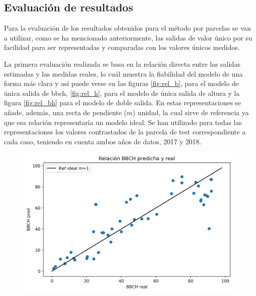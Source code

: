 \subsection{Evaluación de resultados}
\par Para la evaluación de los resultados obtenidos para el método por parcelas se van a utilizar, como se ha mencionado anteriormente, las salidas de valor único por su facilidad para ser representadas y comparadas con los valores únicos medidos. 
\\
\par La primera evaluación realizada se basa en la relación directa entre las salidas estimadas y las medidas reales, lo cuál muestra la fiabilidad del modelo de una forma más clara y así puede verse en las figuras \ref{fig:rel_b}, para el modelo de única salida de \gls{bbch}, \ref{fig:rel_h}, para el modelo de única salida de altura y la figura \ref{fig:rel_bh} para el modelo de doble salida. En estas representaciones se añade, además, una recta de pendiente ($m$) unidad, la cual sirve de referencia ya que esa relación representaría un modelo ideal. Se han utilizado para todas las representaciones los valores contrastados de la parcela de test correspondiente a cada caso, teniendo en cuenta ambos años de datos, 2017 y 2018.
\begin{figure}[h]
\centering
\includegraphics[width=0.95\linewidth]{archivos/tfg/Mean/TEST_PARC_RECTA}
\end{figure}
